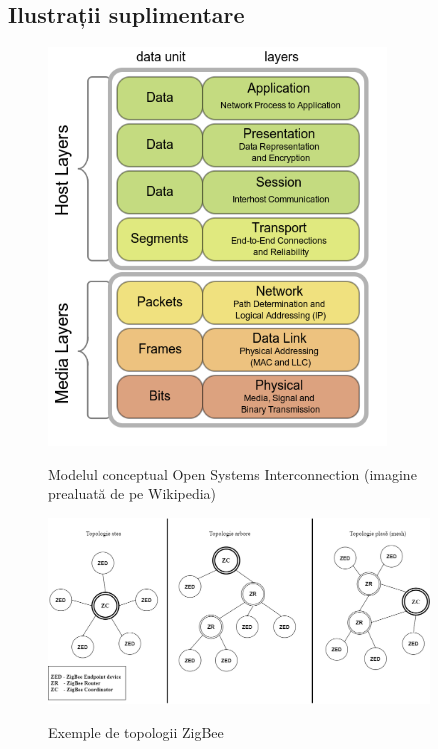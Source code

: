 \begin{appendices}
\chapter{Ilustrații suplimentare}
\label{apx:ilustratii}

\begin{figure}[h]
    \centering
    \caption{\centering Modelul conceptual Open Systems Interconnection \newline (imagine prealuată de pe Wikipedia)}
    \includegraphics[width=0.8\textwidth]{images/OSI_Model_v1.png}
    \label{fig:osi_model}
\end{figure}

\begin{figure}[h]
    \centering
    \caption{Exemple de topologii ZigBee}
    \includegraphics[width=0.9\textwidth]{images/topologii.drawio.png}
    \label{fig:zigbee_networks}
\end{figure}


\end{appendices}
